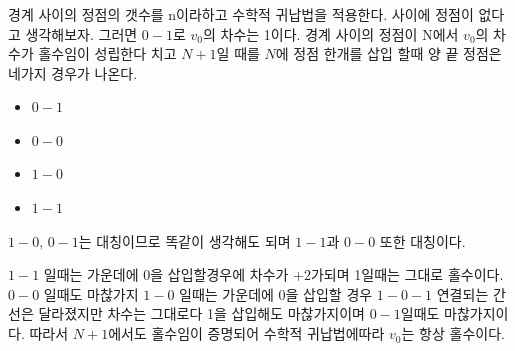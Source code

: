 \subsubsection{}
경계 사이의 정점의 갯수를 n이라하고 수학적 귀납법을 적용한다.
사이에 정점이 없다고 생각해보자. 그러면 $0-1$로 $v_0$의 차수는 1이다.
경계 사이의 정점이 N에서 $v_0$의 차수가 홀수임이 성립한다 치고 $N+1$일 때를 $N$에 정점 한개를 삽입 할때 양 끝 정점은 네가지 경우가 나온다.  
\begin{itemize}
    \item $0 - 1$\\
    \item $0 - 0$\\    
    \item $1 - 0$\\
    \item $1 - 1$\\
\end{itemize}
$1-0$, $0-1$는 대칭이므로 똑같이 생각해도 되며
$1-1$과 $0-0$ 또한 대칭이다.

$1 - 1$ 일때는 가운데에 $0$을 삽입할경우에 차수가 $+2$가되며 1일때는 그대로 홀수이다. $0 - 0$ 일때도 마찮가지
$1 - 0$ 일때는 가운데에 $0$을 삽입할 경우 $1 - 0 - 1$ 연결되는 간선은 달라졌지만 차수는 그대로다 1을 삽입해도 마찮가지이며 $0-1$일때도 마찮가지이다.
따라서 $N+1$에서도 홀수임이 증명되어 수학적 귀납법에따라 $v_0$는 항상 홀수이다.



